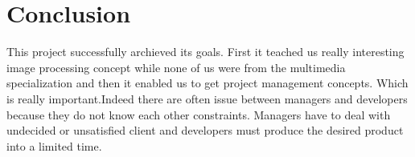
\section{Conclusion}
This project successfully archieved its goals. First it teached us really interesting image processing concept while none of us were from the multimedia specialization and then it enabled us to get project management concepts. Which is really important.Indeed there are often issue between managers and developers because they do not know each other constraints. Managers have to deal with undecided or unsatisfied client and developers must produce the desired product into a limited time.
